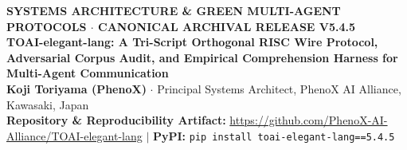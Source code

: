 \documentclass[9pt,a4paper]{extarticle}
\begin{document}
\begin{center}
  {\footnotesize\sffamily\bfseries\color{tealrule} SYSTEMS ARCHITECTURE \& GREEN MULTI-AGENT PROTOCOLS $\cdot$ CANONICAL ARCHIVAL RELEASE V5.4.5}\\[1.0pt]
  {\Large\bfseries\sffamily\color{navyheader} TOAI-elegant-lang: A Tri-Script Orthogonal RISC Wire Protocol, Adversarial Corpus Audit, and Empirical Comprehension Harness for Multi-Agent Communication}\\[1.5pt]
  {\normalsize\bfseries Koji Toriyama (PhenoX)} $\cdot$ {\small Principal Systems Architect, PhenoX AI Alliance, Kawasaki, Japan}\\
  {\footnotesize\sffamily\bfseries Repository \& Reproducibility Artifact:} {\footnotesize\url{https://github.com/PhenoX-AI-Alliance/TOAI-elegant-lang} $|$ \textbf{PyPI:} \texttt{pip install toai-elegant-lang==5.4.5}}
\end{center}
\end{document}
